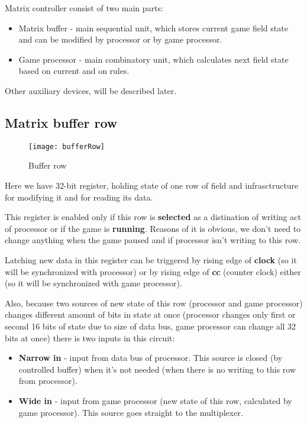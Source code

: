 Matrix controller consist of two main parts:

\begin{itemize}
	\item Matrix buffer - main sequential unit, which stores current game field state and can be modified by processor or by game processor.
	\item Game processor - main combinatory unit, which calculates next field state based on current and on rules.
\end{itemize}

Other auxiliary devices, will be described later.

\subsection*{Matrix buffer row}

\begin{figure}[ht]
	\centering
	\texttt{[image: bufferRow]}
	\caption{Buffer row}
\end{figure}

Here we have 32-bit register, holding state of one row of field and infrasctructure for modifying it and for reading its data. 

This register is enabled only if this row is \textbf{selected} as a distination of writing act of processor or if the game is \textbf{running}. Reasons of it is obvious, we don't need to change anything when the game paused and if processor isn't writing to this row.

Latching new data in this register can be triggered by rising edge of \textbf{clock} (so it will be synchronized with processor) or by rising edge of \textbf{cc} (counter clock) either (so it will be synchronized with game processor).

Also, because two sources of new state of this row (processor and game processor) changes different amount of bits in state at once (processor changes only first or second 16 bits of state due to size of data bus, game processor can change all 32 bits at once) there is two inputs in this circuit:

\begin{itemize}
	\item \textbf{Narrow in} - input from data bus of processor. This source is closed (by controlled buffer) when it's not needed (when there is no writing to this row from processor).
	\item \textbf{Wide in} - input from game processor (new state of this row, calculated by game processor). This source goes straight to the multiplexer.
\end{itemize}

